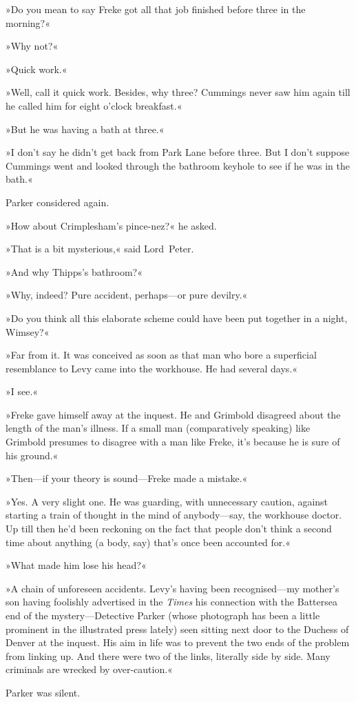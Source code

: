 »Do you mean to say Freke got all that job finished before three in the morning?«

»Why not?«

»Quick work.«

»Well, call it quick work. Besides, why three? Cummings never saw him again till he called him for eight o'clock breakfast.«

»But he was having a bath at three.«

»I don't say he didn't get back from Park Lane before three. But I don't suppose Cummings went and looked through the bathroom keyhole to see if he was in the bath.«

Parker considered again.

»How about Crimplesham's pince-nez?« he asked.

»That is a bit mysterious,« said Lord~Peter.

»And why Thipps's bathroom?«

»Why, indeed? Pure accident, perhaps—or pure devilry.«

»Do you think all this elaborate scheme could have been put together in a night, Wimsey?«

»Far from it. It was conceived as soon as that man who bore a superficial resemblance to Levy came into the workhouse. He had several days.«

»I see.«

»Freke gave himself away at the inquest. He and Grimbold disagreed about the length of the man's illness. If a small man (comparatively speaking) like Grimbold presumes to disagree with a man like Freke, it's because he is sure of his ground.«

»Then—if your theory is sound—Freke made a mistake.«

»Yes. A very slight one. He was guarding, with unnecessary caution, against starting a train of thought in the mind of anybody—say, the workhouse doctor. Up till then he'd been reckoning on the fact that people don't think a second time about anything (a body, say) that's once been accounted for.«

»What made him lose his head?«

»A chain of unforeseen accidents. Levy's having been recognised—my mother's son having foolishly advertised in the \textit{Times} his connection with the Battersea end of the mystery—Detective Parker (whose photograph has been a little prominent in the illustrated press lately) seen sitting next door to the Duchess of Denver at the inquest. His aim in life was to prevent the two ends of the problem from linking up. And there were two of the links, literally side by side. Many criminals are wrecked by over-caution.«

Parker was silent.
